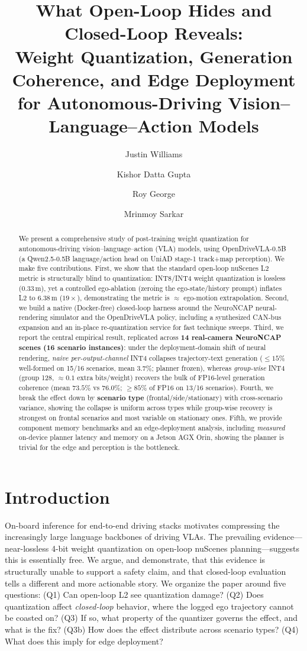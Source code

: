 \documentclass[11pt]{article}
\title{\textbf{What Open-Loop Hides and Closed-Loop Reveals:\\
Weight Quantization, Generation Coherence, and Edge Deployment\\
for Autonomous-Driving Vision--Language--Action Models}}
\author[1]{Justin Williams}
\author[1]{Kishor Datta Gupta}
\author[1]{Roy George}
\author[1]{Mrinmoy Sarkar}
\affil[1]{Clark Atlanta University \quad \texttt{justinwilliamstech693@gmail.com}}
\date{}
\begin{document}
\maketitle

\begin{abstract}
We present a comprehensive study of post-training weight quantization for autonomous-driving
vision--language--action (VLA) models, using OpenDriveVLA-0.5B (a Qwen2.5-0.5B language/action head
on UniAD stage-1 track+map perception). We make five contributions. First, we show that the
standard open-loop nuScenes L2 metric is structurally blind to quantization: INT8/INT4 weight
quantization is lossless ($0.33$\,m), yet a controlled ego-ablation (zeroing the ego-state/history
prompt) inflates L2 to $6.38$\,m ($19\times$), demonstrating the metric is $\approx$ ego-motion
extrapolation. Second, we build a native (Docker-free) closed-loop harness around the NeuroNCAP
neural-rendering simulator and the OpenDriveVLA policy, including a synthesized CAN-bus expansion
and an in-place re-quantization service for fast technique sweeps. Third, we report the central
empirical result, replicated across \textbf{14 real-camera NeuroNCAP scenes (16 scenario
instances)}: under the deployment-domain shift of neural rendering, \emph{naive per-output-channel}
INT4 collapses trajectory-text generation ($\le 15\%$ well-formed on 15/16 scenarios, mean $3.7\%$;
planner frozen), whereas \emph{group-wise} INT4 (group 128, $\approx 0.1$ extra bits/weight) recovers
the bulk of FP16-level generation coherence (mean $73.5\%$ vs $76.0\%$; $\ge 85\%$ of FP16 on 13/16
scenarios). Fourth, we break the effect down by \textbf{scenario type} (frontal/side/stationary)
with cross-scenario variance, showing the collapse is uniform across types while group-wise recovery
is strongest on frontal scenarios and most variable on stationary ones. Fifth, we provide component
memory benchmarks and an edge-deployment analysis, including \emph{measured} on-device planner
latency and memory on a Jetson AGX Orin, showing the planner is trivial for the edge and perception
is the bottleneck.
\end{abstract}

\tableofcontents

\section{Introduction}
On-board inference for end-to-end driving stacks motivates compressing the increasingly large
language backbones of driving VLAs. The prevailing evidence---near-lossless 4-bit weight
quantization on open-loop nuScenes planning---suggests this is essentially free. We argue, and
demonstrate, that this evidence is structurally unable to support a safety claim, and that
closed-loop evaluation tells a different and more actionable story. We organize the paper around
five questions: (Q1) Can open-loop L2 see quantization damage? (Q2) Does quantization affect
\emph{closed-loop} behavior, where the logged ego trajectory cannot be coasted on? (Q3) If so, what
property of the quantizer governs the effect, and what is the fix? (Q3b) How does the effect
distribute across scenario types? (Q4) What does this imply for edge deployment?
\end{document}
